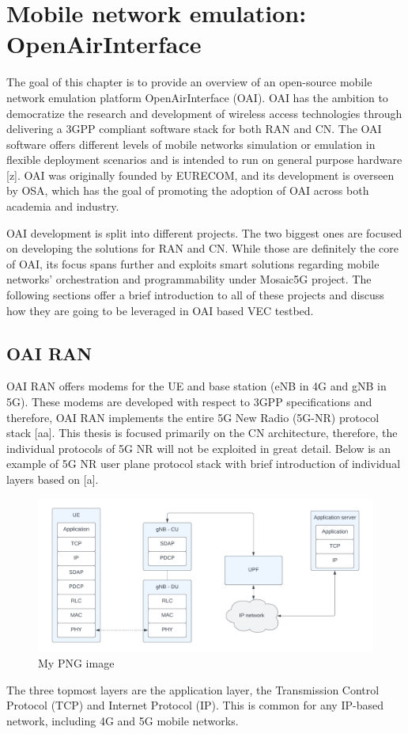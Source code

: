 \documentclass[12pt,a4paper,twoside]{report}
\begin{document}
\chapter{Mobile network emulation: \texorpdfstring{\\ \mbox{OpenAirInterface}}{OpenAirInterface}}
The goal of this chapter is to provide an overview of an open-source mobile network emulation platform OpenAirInterface (OAI). OAI has the ambition to democratize the research and development of wireless access technologies through delivering a 3GPP compliant software stack for both RAN and CN. The OAI software offers different levels of mobile networks simulation or emulation in flexible deployment scenarios and is intended to run on general purpose hardware [z]. OAI was originally founded by EURECOM, and its development is overseen by OSA, which has the goal of promoting the adoption of OAI across both academia and industry. 

OAI development is split into different projects. The two biggest ones are focused on developing the solutions for RAN and CN. While those are definitely the core of OAI, its focus spans further and exploits smart solutions regarding mobile networks’ orchestration and programmability under Mosaic5G project. The following sections offer a brief introduction to all of these projects and discuss how they are going to be leveraged in OAI based VEC testbed.

\section{OAI RAN}
OAI RAN offers modems for the UE and base station (eNB in 4G and gNB in 5G). These modems are developed with respect to 3GPP specifications and therefore, OAI RAN implements the entire 5G New Radio (5G-NR) protocol stack [aa]. This thesis is focused primarily on the CN architecture, therefore, the individual protocols of 5G NR will not be exploited in great detail. Below is an example of 5G NR user plane protocol stack with brief introduction of individual layers based on [a].

\begin{figure}[ht]
	\centering
	\includegraphics[width=13cm]{./images/5G-NR-protstack.png} 
	\caption{My PNG image}
\end{figure}
The three topmost layers are the application layer, the Transmission Control Protocol (TCP) and Internet Protocol (IP). This is common for any IP-based network, including 4G and 5G mobile networks.
\end{document}
